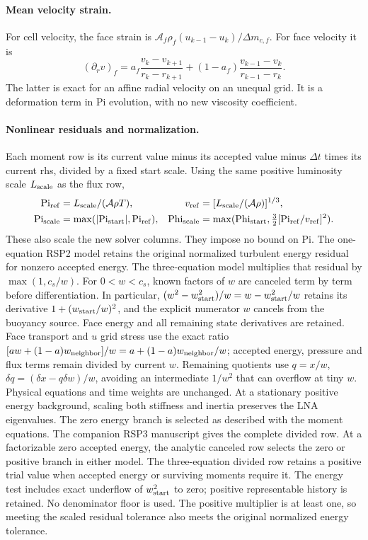 \documentclass[11pt]{article}
\begin{document}
\paragraph{Mean velocity strain.}
For cell velocity, the face strain is
$\mathcal A_f\rho_f(u_{k-1}-u_k)/\Delta m_{c,f}$.
For face velocity it is
\begin{equation}
 (\partial_r v)_f=a_f\frac{v_k-v_{k+1}}{r_k-r_{k+1}}
 +(1-a_f)\frac{v_{k-1}-v_k}{r_{k-1}-r_k}.
\end{equation}
The latter is exact for an affine radial velocity on an unequal grid.
It is a deformation term in Pi evolution, with no new viscosity coefficient.

\paragraph{Nonlinear residuals and normalization.}
Each moment row is its current value minus its accepted value minus
$\Delta t$ times its current rhs, divided by a fixed start scale.
Using the same positive luminosity scale $L_{\rm scale}$ as the flux row,
\begin{align}
 \mathrm{Pi}_{\rm ref}&=L_{\rm scale}/(\mathcal A\rho T),
 &v_{\rm ref}&=[L_{\rm scale}/(\mathcal A\rho)]^{1/3},\\
 \mathrm{Pi}_{\rm scale}&=\max(|\mathrm{Pi}_{\rm start}|,\mathrm{Pi}_{\rm ref}),
 &\mathrm{Phi}_{\rm scale}&=\max(\mathrm{Phi}_{\rm start},
                \tfrac32[\mathrm{Pi}_{\rm ref}/v_{\rm ref}]^2).
\end{align}
These also scale the new solver columns. They impose no bound on Pi.
The one-equation RSP2 model retains the original normalized turbulent energy
residual for nonzero accepted energy. The three-equation model multiplies
that residual by $\max(1,c_s/w)$. For $0<w<c_s$, known factors of $w$
are canceled term by term before differentiation. In particular,
$(w^2-w_{\rm start}^2)/w=w-w_{\rm start}^2/w$ retains its derivative
$1+(w_{\rm start}/w)^2$, and the explicit numerator $w$ cancels from
the buoyancy source. Face energy and all remaining state derivatives are
retained. Face transport and $u$ grid stress use the exact ratio
$[a w+(1-a)w_{\rm neighbor}]/w=a+(1-a)w_{\rm neighbor}/w$;
accepted energy, pressure and flux terms remain divided by current $w$.
Remaining quotients use $q=x/w$, $\delta q=(\delta x-q\delta w)/w$,
avoiding an intermediate $1/w^2$ that can overflow at tiny $w$.
Physical equations and time weights are unchanged. At a stationary positive
energy background, scaling both stiffness and inertia preserves the LNA
eigenvalues. The zero energy branch is selected as described with the
moment equations.
The companion RSP3 manuscript gives the complete divided row.
At a factorizable zero accepted energy, the analytic canceled row selects the zero
or positive branch in either model. The three-equation divided row retains
a positive trial value when accepted energy or surviving moments require it.
The energy test includes exact underflow of $w_{\rm start}^2$ to zero;
positive representable history is retained. No denominator floor is used.
The positive multiplier is at least one, so meeting the scaled residual
tolerance also meets the original normalized energy tolerance.
\end{document}
